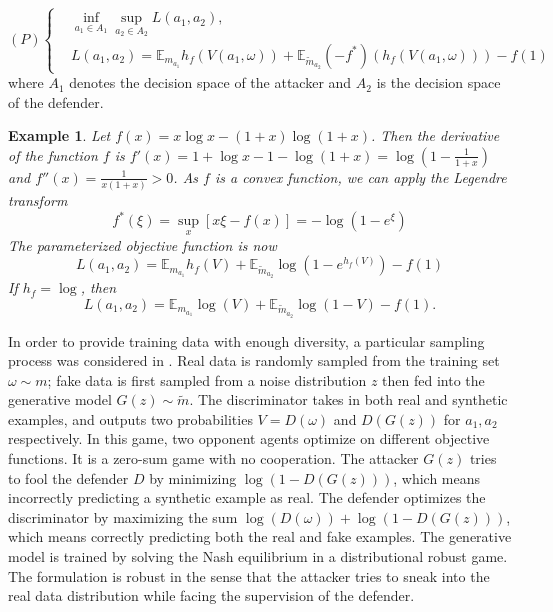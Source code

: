 \documentclass{article}
\newtheorem{example}{Example}
\begin{document}
\begin{equation}
\label{eq1}
(P)\left\{
\begin{aligned}
&\inf_{a_1\in A_1} \sup_{a_2\in A_2} L(a_1,a_2),\\
&L(a_1,a_2) = \mathbb{E}_{m_{a_1}} h_f(V(a_1,\omega)) + \mathbb{E}_{\tilde{m}_{a_2}}(-f^*)(h_f(V(a_1,\omega) ))-f(1)
\end{aligned}
\right.
\end{equation}
where $A_1$ denotes the decision space of the attacker and $A_2$ is the decision space of the defender.

\begin{example}
Let $f(x)=x\log x - (1+x)\log (1+x)$. Then the derivative of the function $f$ is $f'(x)=1+\log x  -1-\log(1+x)=\log(1-\frac{1}{1+x})$ and $f''(x)=\frac{1}{x(1+x)}>0$. As $f$ is a convex function, we can apply the Legendre transform
\begin{equation*}
f^*(\xi)=\sup_{x}[ x\xi-f(x)]=-\log(1-e^{\xi})
\end{equation*}
The parameterized objective function is now
\begin{equation*}
L(a_1,a_2)=\mathbb{E}_{m_{a_1}} h_f(V) +  \mathbb{E}_{\tilde{m}_{a_2}}\log (1-e^{h_f(V)})-f(1)
\end{equation*}
If $h_f=\log$, then
\begin{equation*}
L(a_1,a_2)=\mathbb{E}_{m_{a_1}} \log(V) +  \mathbb{E}_{\tilde{m}_{a_2}}\log (1-V)-f(1).
\end{equation*}
\end{example}

In order to provide training data with enough diversity, a particular sampling process was considered in \cite{gan05}. Real data is randomly sampled from the training set $\omega \sim m$; fake data is first sampled from a noise distribution $z$ then fed into the generative model $G(z) \sim \tilde{m}$. The discriminator takes in both real and synthetic examples, and outputs two probabilities $V=D(\omega)$ and $D(G(z))$ for $a_1, a_2$ respectively. In this game, two opponent agents optimize on different objective functions. It is a zero-sum game with no cooperation. The attacker $G(z)$ tries to fool the defender $D$ by minimizing $\log(1-D(G(z)))$, which means incorrectly predicting a synthetic example as real. The defender optimizes the discriminator by maximizing the sum $\log(D(\omega)) + \log(1-D(G(z)))$, which means correctly predicting both the real and fake examples.
The generative model is trained by solving the Nash equilibrium in a distributional robust game. The formulation is robust in the sense that the attacker tries to sneak into the real data distribution while facing the supervision of the defender.
\end{document}
